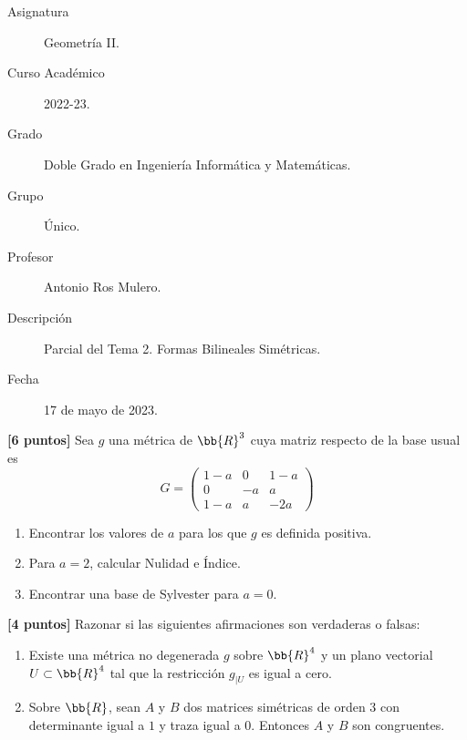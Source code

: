 \documentclass[12pt]{article}
\begin{document}

    
    

    \begin{description}
        \item[Asignatura] Geometría II.
        \item[Curso Académico] 2022-23.
        \item[Grado] Doble Grado en Ingeniería Informática y Matemáticas.
        \item[Grupo] Único.
        \item[Profesor] Antonio Ros Mulero.
        \item[Descripción] Parcial del Tema 2. Formas Bilineales Simétricas.
        \item[Fecha] 17 de mayo de 2023.
    
    \end{description}
    \newpage
    
    \begin{ejercicio}\textbf{[6 puntos]}
Sea $g$ una métrica de $\bb{R}^3$ cuya matriz respecto de la base usual es
\begin{equation*}
    G = \left(\begin{array}{ccc}
        1-a & 0 & 1-a \\
        0 & -a & a \\
        1-a & a & -2a
    \end{array}\right)
\end{equation*}
\begin{enumerate}
    \item Encontrar los valores de $a$ para los que $g$ es definida positiva.

    \item Para $a=2$, calcular Nulidad e Índice.

    \item Encontrar una base de Sylvester para $a=0$.
\end{enumerate}
\end{ejercicio}

\begin{ejercicio}\textbf{[4 puntos]}
    Razonar si las siguientes afirmaciones son verdaderas o falsas:
    \begin{enumerate}
        \item Existe una métrica no degenerada $g$ sobre $\bb{R}^4$ y un plano vectorial $U\subset \bb{R}^4$ tal que la restricción $g_{\big|U}$ es igual a cero.

        \item Sobre $\bb{R}$, sean $A$ y $B$ dos matrices simétricas de orden 3 con determinante igual a $1$ y traza igual a $0$. Entonces $A$ y $B$ son congruentes.
    \end{enumerate}
\end{ejercicio}
\end{document}
